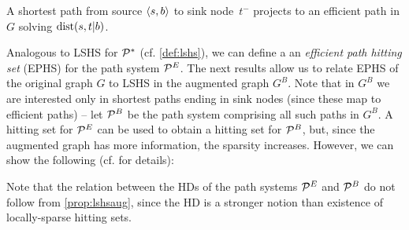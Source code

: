 \begin{proposition}\label{prop:shorteffic}
	A shortest path from source $\langle s,b\rangle$ to sink node~$t^-$ projects to an efficient path in $G$ solving $\mbox{dist}(s,t|b)$. 
\end{proposition}


Analogous to LSHS for $\mathcal{P}^*$ (cf. \cref{def:lshs}), we can define a an \emph{efficient path hitting set} (EPHS) for the path system $\mathcal{P}^E$.
The next results allow us to relate EPHS of the original graph $G$ to LSHS in the augmented graph $G^B$.
Note that in $G^B$ we are interested only in shortest paths ending in sink nodes (since these map to efficient paths) -- let $\mathcal{P}^B$ be the path system comprising all such paths in $G^B$.
A hitting set for $\mathcal{P}^E$ can be used to obtain a hitting set for $\mathcal{P}^B$, but, since the augmented graph has more information, the sparsity increases. However, we can show the following (cf. \cite{TechReport} for details):
\noindent Note that the relation between the HDs of the path systems $\mathcal{P}^E$ and $\mathcal{P}^B$ do not follow from \cref{prop:lshsaug}, since the HD is a stronger notion than existence of locally-sparse hitting sets.

